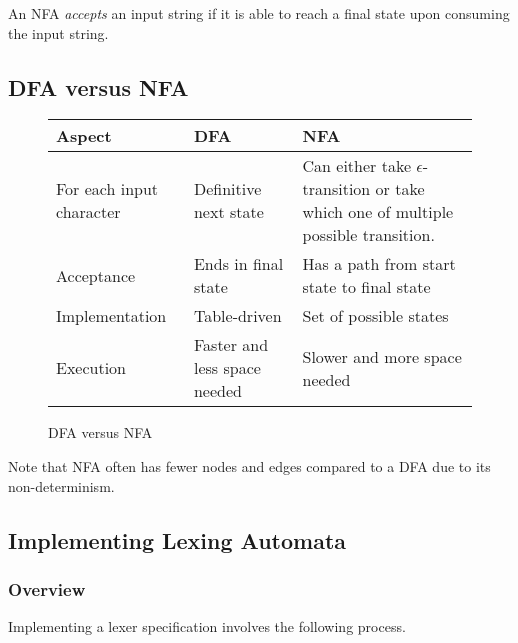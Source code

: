 \begin{definition}
    An NFA \textit{accepts} an input string if it is able to reach a final state upon consuming the input string.
\end{definition}

\subsection{DFA versus NFA}

\begin{figure}[H]
    \centering
    \begin{tabular}{@{} p{10em} p{10em} p{10em} @{}}
        \toprule
        Aspect & DFA & NFA \\
        \midrule
        For each input character 
        & Definitive next state 
        & Can either take $\epsilon$-transition or take which one of multiple possible transition. \\
        Acceptance
        & Ends in final state
        & Has a path from start state to final state \\
        Implementation 
        & Table-driven
        & Set of possible states \\
        Execution
        & Faster and less space needed
        & Slower and more space needed \\
        \bottomrule
    \end{tabular}
    \caption{DFA versus NFA}
    \label{fig:dfa-vs-nfa}
\end{figure}

\begin{remark}
    Note that NFA often has fewer nodes and edges compared to a DFA due to its non-determinism.
\end{remark}

\subsection{Implementing Lexing Automata}

\subsubsection{Overview}

Implementing a lexer specification involves the following process.

